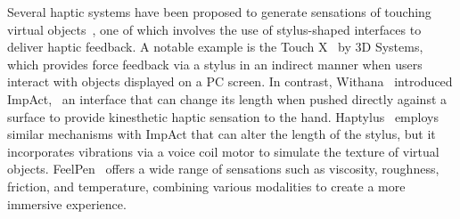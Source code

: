 Several haptic systems have been proposed to generate sensations of touching virtual objects~\cite{MultimodalHapticDisplay}, one of which involves the use of stylus-shaped interfaces to deliver haptic feedback. 
A notable example is the Touch X~\cite{Touchx} by 3D Systems, which provides force feedback via a stylus in an indirect manner when users interact with objects displayed on a PC screen. 
In contrast, Withana \etal\ introduced ImpAct,~\cite{ImpAct} an interface that can change its length when pushed directly against a surface to provide kinesthetic haptic sensation to the hand.
Haptylus~\cite{Haptylus} employs similar mechanisms with ImpAct that can alter the length of the stylus, but it incorporates vibrations via a voice coil motor to simulate the texture of virtual objects. 
FeelPen~\cite{FeelPen} offers a wide range of sensations such as viscosity, roughness, friction, and temperature, combining various modalities to create a more immersive experience.
